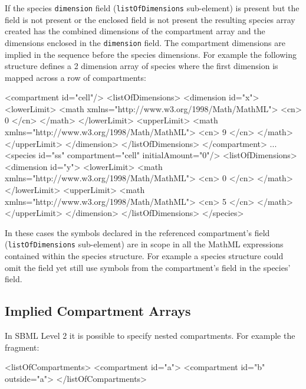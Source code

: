 \documentclass{cekarticle}
\begin{document}
If the species \texttt{dimension} field (\texttt{listOfDimensions} sub-element) is present but
the  field is not present or the enclosed  field is not present
the resulting species array created has the combined dimensions
of the compartment array and the dimensions enclosed in the \texttt{dimension} field.
The compartment dimensions are implied in the sequence before the species dimensions.
For example the following structure defines a 2
dimension array of species where the first dimension is mapped across a row of compartments:
\begin{example}
<compartment id="cell"/>
    <listOfDimensions>
        <dimension id="x">
            <lowerLimit>
                <math xmlns="http://www.w3.org/1998/Math/MathML">
                    <cn> 0 </cn>
                </math>
            </lowerLimit>
            <upperLimit>
                <math xmlns="http://www.w3.org/1998/Math/MathML">
                    <cn> 9 </cn>
                </math>
            </upperLimit>
        </dimension>
    </listOfDimensions>
</compartment>
...
<species id="ss" compartment="cell" initialAmount="0"/>
    <listOfDimensions>
        <dimension id="y">
            <lowerLimit>
                <math xmlns="http://www.w3.org/1998/Math/MathML">
                    <cn> 0 </cn>
                </math>
            </lowerLimit>
            <upperLimit>
                <math xmlns="http://www.w3.org/1998/Math/MathML">
                    <cn> 5 </cn>
                </math>
            </upperLimit>
        </dimension>
    </listOfDimensions>
</species>
\end{example}

In these cases the symbols declared in the referenced compartment's  field (\texttt{listOfDimensions} sub-element)
are in scope in all the MathML expressions contained within the species structure.  For example a species structure
could omit the  field yet still use symbols from the compartment's  field
in the species'  field.

\subsection{Implied Compartment Arrays}

In SBML Level 2 it is possible to specify nested compartments.
For example the fragment:

\begin{example}
<listOfCompartments>
    <compartment id="a">
    <compartment id="b" outside="a">
</listOfCompartments>
\end{example}
\end{document}
